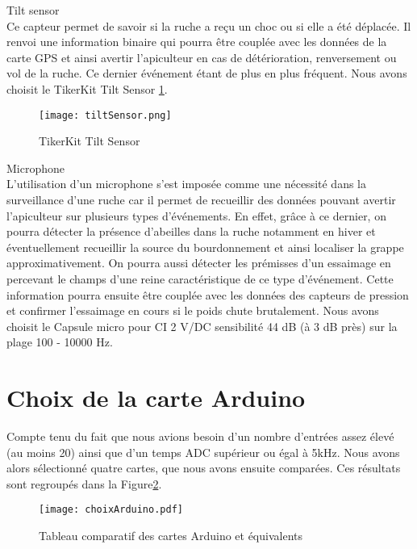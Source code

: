 Tilt sensor\\

Ce capteur permet de savoir si la ruche a reçu un choc ou si elle a été déplacée. Il renvoi une information binaire qui pourra être couplée avec les données de la carte GPS et ainsi avertir l'apiculteur en cas de détérioration, renversement ou vol de la ruche. Ce dernier événement étant de plus en plus fréquent. Nous avons choisit le TikerKit Tilt Sensor \ref{fig:tiltSensor}.\\

\begin{figure}[h]
\centering\texttt{[image: tiltSensor.png]}
\caption{\label{fig:tiltSensor} TikerKit Tilt Sensor}
\end{figure} 
     

Microphone\\

L'utilisation d'un microphone s'est imposée comme une nécessité dans la surveillance d'une ruche car il permet de recueillir des données pouvant avertir l'apiculteur sur plusieurs types d'événements. En effet, grâce à ce dernier, on pourra détecter la présence d'abeilles dans la ruche notamment en hiver et éventuellement recueillir la source du bourdonnement et ainsi localiser la grappe approximativement. On pourra aussi détecter les prémisses d'un essaimage en percevant le champs d'une reine caractéristique de ce type d'événement. Cette information pourra ensuite être couplée avec les données des capteurs de pression et confirmer l'essaimage en cours si le poids chute brutalement. 
Nous avons choisit le Capsule micro pour CI 2 V/DC sensibilité 44 dB (à 3 dB près) sur la plage 100 - 10000 Hz. 

\section{Choix de la carte Arduino}
\vspace{1.5cm}

Compte tenu du fait que nous avions besoin d'un nombre d'entrées assez élevé (au moins 20) ainsi que d'un temps ADC supérieur ou égal à 5kHz. Nous avons alors sélectionné quatre cartes, que nous avons ensuite comparées. Ces résultats sont regroupés dans la Figure\ref{fig:choixardui}.

\begin{figure}[h]
\centering\texttt{[image: choixArduino.pdf]}
\caption{\label{fig:choixardui} Tableau comparatif des cartes Arduino et équivalents}
\end{figure} 

